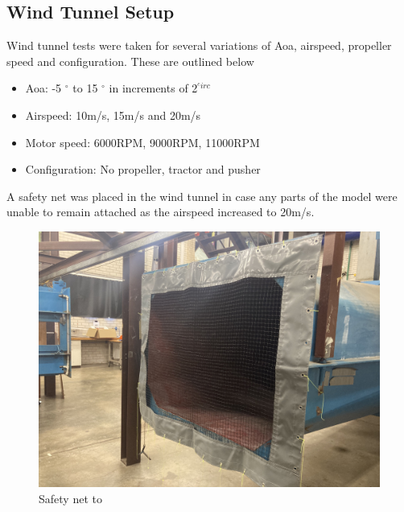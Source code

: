 \subsection{Wind Tunnel Setup}

Wind tunnel tests were taken for several variations of Aoa, airspeed, propeller speed and configuration. These are outlined below

\begin{itemize}
    \item Aoa: -5 $^{\circ}$ to 15 $^{\circ}$ in increments of 2$^{^circ}$
    \item Airspeed: 10m/s, 15m/s and 20m/s
    \item Motor speed: 6000RPM, 9000RPM, 11000RPM
    \item Configuration: No propeller, tractor and pusher
\end{itemize}

A safety net was placed in the wind tunnel in case any parts of the model were unable to remain attached as the airspeed increased to 20m/s.

\begin{figure}[!ht]
    \centering
    \includegraphics[scale =0.1]{04_Methodology/Figs/windTunnelNet.jpg}
    \caption{Safety net to }
    \label{fig:windTunnelNet}
\end{figure}

